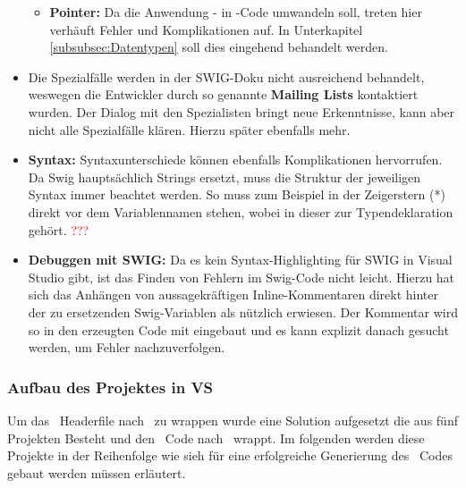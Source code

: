 \begin{itemize}
\begin{itemize}
	\item \textbf{Pointer:} Da die Anwendung \CC - in \CS -Code umwandeln soll, treten hier verhäuft Fehler und Komplikationen auf. In Unterkapitel \ref{subsubsec:Datentypen} soll dies eingehend behandelt werden. 
	\end{itemize}
\item Die Spezialfälle werden in der SWIG-Doku nicht ausreichend behandelt, weswegen die Entwickler durch so genannte \textbf{Mailing Lists} kontaktiert wurden. Der Dialog mit den Spezialisten bringt neue Erkenntnisse, kann aber nicht alle Spezialfälle klären. Hierzu später ebenfalls mehr.
\item \textbf{Syntax:} Syntaxunterschiede können ebenfalls Komplikationen hervorrufen. Da Swig hauptsächlich Strings ersetzt, muss die Struktur der jeweiligen Syntax immer beachtet werden. So muss zum Beispiel in \CC der Zeigerstern (*) direkt vor dem Variablennamen stehen, wobei in \CS dieser zur Typendeklaration gehört. \textcolor{red}{???}
\item \textbf{Debuggen mit SWIG:} Da es kein Syntax-Highlighting für SWIG in Visual Studio gibt, ist das Finden von Fehlern im Swig-Code nicht leicht. Hierzu hat sich das Anhängen von aussagekräftigen Inline-Kommentaren direkt hinter der zu ersetzenden Swig-Variablen als nützlich erwiesen. Der Kommentar wird so in den erzeugten Code mit eingebaut und es kann explizit danach gesucht werden, um Fehler nachzuverfolgen.
\end{itemize}

\subsubsection{Aufbau des Projektes in VS}\label{subsubsec:Aufbau}

Um das \CC~Headerfile nach \CS~zu wrappen wurde eine Solution aufgesetzt die aus fünf Projekten Besteht und den \CC~Code nach \CS~wrappt. Im folgenden werden diese Projekte in der Reihenfolge wie sieh für eine erfolgreiche Generierung des \CS~Codes gebaut werden müssen erläutert.\\


